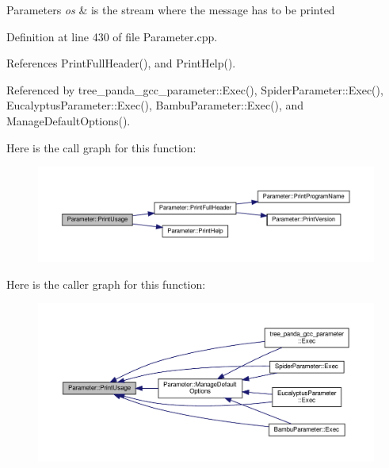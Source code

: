 \begin{DoxyParams}{Parameters}
{\em os} & is the stream where the message has to be printed \\
\hline
\end{DoxyParams}


Definition at line 430 of file Parameter.\+cpp.



References Print\+Full\+Header(), and Print\+Help().



Referenced by tree\+\_\+panda\+\_\+gcc\+\_\+parameter\+::\+Exec(), Spider\+Parameter\+::\+Exec(), Eucalyptus\+Parameter\+::\+Exec(), Bambu\+Parameter\+::\+Exec(), and Manage\+Default\+Options().

Here is the call graph for this function\+:
\nopagebreak
\begin{figure}[H]
\begin{center}
\leavevmode
\includegraphics[width=350pt]{dc/dab/classParameter_adc61c03b1728232c3262eae19ea17687_cgraph}
\end{center}
\end{figure}
Here is the caller graph for this function\+:
\nopagebreak
\begin{figure}[H]
\begin{center}
\leavevmode
\includegraphics[width=350pt]{dc/dab/classParameter_adc61c03b1728232c3262eae19ea17687_icgraph}
\end{center}
\end{figure}
\mbox{\label{classParameter_a061fc14e1db48812ec5a6e7d6e80e1a0}} 
